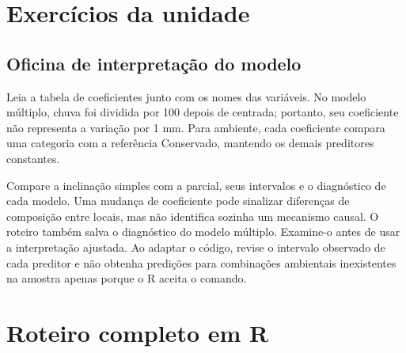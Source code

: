 \section{Exercícios da unidade}
\begin{enumerate}
\end{enumerate}
\subsection*{Oficina de interpretação do modelo}
Leia a tabela de coeficientes junto com os nomes das variáveis. No modelo múltiplo, chuva foi dividida por 100 depois de centrada; portanto, seu coeficiente não representa a variação por 1 mm. Para ambiente, cada coeficiente compara uma categoria com a referência Conservado, mantendo os demais preditores constantes.

Compare a inclinação simples com a parcial, seus intervalos e o diagnóstico de cada modelo. Uma mudança de coeficiente pode sinalizar diferenças de composição entre locais, mas não identifica sozinha um mecanismo causal. O roteiro também salva o diagnóstico do modelo múltiplo. Examine-o antes de usar a interpretação ajustada. Ao adaptar o código, revise o intervalo observado de cada preditor e não obtenha predições para combinações ambientais inexistentes na amostra apenas porque o R aceita o comando.
\clearpage
\section{Roteiro completo em R}

